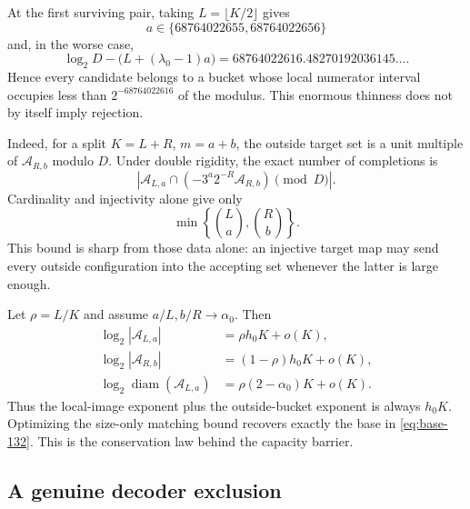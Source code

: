 \documentclass[11pt]{amsart}
\numberwithin{equation}{section}
\newcommand{\A}{\mathcal A}
\begin{document}
At the first surviving pair, taking $L=\lfloor K/2\rfloor$ gives
\[
a\in\{68764022655,68764022656\}
\]
and, in the worse case,
\begin{equation}\label{eq:half-thinness}
\log_2D-\bigl(L+(\lambda_0-1)a\bigr)
=68764022616.48270192036145\ldots.
\end{equation}
Hence every candidate belongs to a bucket whose local numerator interval occupies less than $2^{-68764022616}$ of the modulus.  This enormous thinness does not by itself imply rejection.

Indeed, for a split $K=L+R$, $m=a+b$, the outside target set is a unit multiple of $\A_{R,b}$ modulo $D$.  Under double rigidity, the exact number of completions is
\begin{equation}\label{eq:intersection-form}
\left|
\A_{L,a}
\cap
\left(-3^a2^{-R}\A_{R,b}\right)
\pmod D
\right|.
\end{equation}
Cardinality and injectivity alone give only
\begin{equation}\label{eq:capacity}
\min\left\{\binom La,\binom Rb\right\}.
\end{equation}
This bound is sharp from those data alone: an injective target map may send every outside configuration into the accepting set whenever the latter is large enough.

Let $\rho=L/K$ and assume $a/L,b/R\to\alpha_0$.  Then
\begin{align}
\log_2|\A_{L,a}|&=\rho h_0K+o(K),\label{eq:local-card-exp}\\
\log_2|\A_{R,b}|&=(1-\rho)h_0K+o(K),\label{eq:outside-card-exp}\\
\log_2\operatorname{diam}(\A_{L,a})&=\rho(2-\alpha_0)K+o(K).\label{eq:range-exp}
\end{align}
Thus the local-image exponent plus the outside-bucket exponent is always $h_0K$.  Optimizing the size-only matching bound recovers exactly the base in \eqref{eq:base-132}.  This is the conservation law behind the capacity barrier.

\subsection{A genuine decoder exclusion}
\end{document}
